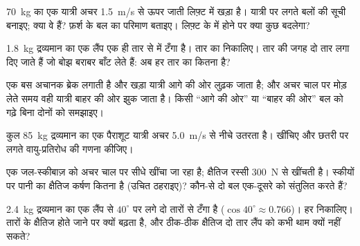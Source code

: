 \begin{exercise}[$\star\star$]\label{exo:g10:inertia:7}
\qty{70}{kg} का एक यात्री अचर \qty{1.5}{m/s} से ऊपर जाती लिफ़्ट में खड़ा है। यात्री
पर लगते बलों की सूची बनाइए; क्या वे  हैं?
फ़र्श के बल का परिमाण बताइए। लिफ़्ट के  में होने पर क्या
कुछ बदलेगा?
\end{exercise}

\begin{exercise}[$\star\star$]\label{exo:g10:inertia:8}
\qty{1.8}{kg} द्रव्यमान का एक लैंप एक ही  तार से  में टँगा है।
तार का  निकालिए। तार की जगह दो \emph{} तार लगा दिए
जाते हैं जो बोझ बराबर बाँट लेते हैं: अब हर तार का  कितना
है?
\end{exercise}

\begin{exercise}[$\star\star$]\label{exo:g10:inertia:9}
एक बस अचानक ब्रेक लगाती है और खड़ा यात्री आगे की ओर लुढ़क जाता है; और
अचर चाल पर मोड़ लेते समय वही यात्री बाहर की ओर झुक जाता है। किसी ``आगे
की ओर'' या ``बाहर की ओर'' बल को गढ़े बिना दोनों को समझाइए।
\end{exercise}

\begin{exercise}[$\star\star$]\label{exo:g10:inertia:10}
कुल \qty{85}{kg} द्रव्यमान का एक पैराशूट यात्री अचर \qty{5.0}{m/s} से
 नीचे उतरता है।  खींचिए और छतरी पर
लगते वायु-प्रतिरोध की गणना कीजिए।
\end{exercise}

\begin{exercise}[$\star\star$]\label{exo:g10:inertia:11}
एक जल-स्कीबाज़ को अचर चाल पर सीधे खींचा जा रहा है; क्षैतिज रस्सी \qty{300}{N}
से खींचती है। स्कीयों पर पानी का क्षैतिज कर्षण कितना है (उचित ठहराइए)?
कौन-से दो  बल एक-दूसरे को संतुलित करते हैं?
\end{exercise}

\begin{exercise}[$\star\star\star$]\label{exo:g10:inertia:12}
\qty{2.4}{kg} द्रव्यमान का एक लैंप  से $40^\circ$ पर लगे दो तारों से टँगा
है ($\cos 40^\circ \approx 0.766$)। हर  निकालिए। तारों के क्षैतिज होते जाने पर
 क्यों बढ़ता है, और ठीक-ठीक क्षैतिज दो तार लैंप को कभी थाम
क्यों नहीं सकते?
\end{exercise}

